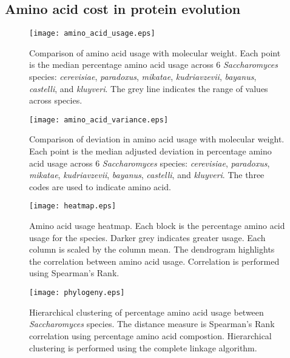 \subsection{Amino acid cost in protein evolution}

\begin{figure}
  \centering
  \texttt{[image: amino\_acid\_usage.eps]}
  \caption[Comparison of amino acid usage with molecular weight]{Comparison of amino acid usage with molecular weight. Each point is the median percentage amino acid usage across 6 \emph{Saccharomyces} species: \emph{cerevisiae}, \emph{paradoxus}, \emph{mikatae}, \emph{kudriavzevii}, \emph{bayanus}, \emph{castelli}, and \emph{kluyveri}. The grey line indicates the range of values across species.}
  \label{figure:amino_acid_usage}
\end{figure}

\begin{figure}
  \centering
  \texttt{[image: amino\_acid\_variance.eps]}
  \caption[Comparison of deviation in amino acid usage with molecular weight]{Comparison of deviation in amino acid usage with molecular weight. Each point is the median adjusted deviation in percentage amino acid usage across 6 \emph{Saccharomyces} species: \emph{cerevisiae}, \emph{paradoxus}, \emph{mikatae}, \emph{kudriavzevii}, \emph{bayanus}, \emph{castelli}, and \emph{kluyveri}. The three codes are used to indicate amino acid.}
  \label{figure:amino_acid_variance}
\end{figure}

\begin{figure}
  \centering
  \texttt{[image: heatmap.eps]}
  \caption[Amino acid usage heatmap]{Amino acid usage heatmap. Each block is the percentage amino acid usage for the species. Darker grey indicates greater usage. Each column is scaled by the column mean. The dendrogram highlights the correlation between amino acid usage. Correlation is performed using Spearman's Rank.}
  \label{figure:phylogeny}
\end{figure}

\begin{figure}
  \centering
  \texttt{[image: phylogeny.eps]}
  \caption[Hierarchical clustering of species amino acid usage]{Hierarchical clustering of percentage amino acid usage between \emph{Saccharomyces} species. The distance measure is Spearman's Rank correlation using percentage amino acid compostion. Hierarchical clustering is performed using the complete linkage algorithm.}
  \label{figure:phylogeny}
\end{figure}


